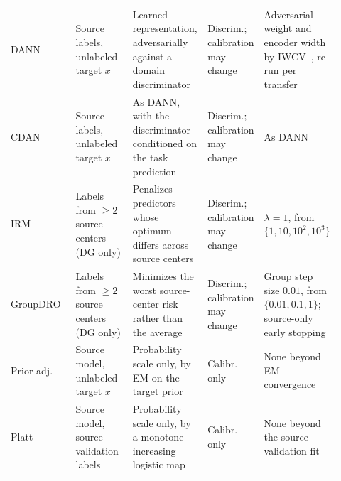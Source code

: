 \begin{table}[t]
\begin{tabular}{@{}p{0.12\linewidth}p{0.20\linewidth}p{0.23\linewidth}p{0.16\linewidth}p{0.21\linewidth}@{}}
DANN~\cite{ganin2016domain} & Source labels, unlabeled target $x$ &
Learned representation, adversarially against a domain discriminator &
Discrim.; calibration may change &
Adversarial weight and encoder width by IWCV~\cite{sugiyama2007covariate},
re-run per transfer \\

CDAN~\cite{long2018conditional} & Source labels, unlabeled target $x$ &
As DANN, with the discriminator conditioned on the task prediction &
Discrim.; calibration may change &
As DANN \\

IRM~\cite{arjovsky2019invariant} &
Labels from $\geq 2$ source centers (DG only) &
Penalizes predictors whose optimum differs across source centers &
Discrim.; calibration may change &
$\lambda = 1$, from $\{1, 10, 10^2, 10^3\}$ \\

GroupDRO~\cite{sagawa2020distributionally} &
Labels from $\geq 2$ source centers (DG only) &
Minimizes the worst source-center risk rather than the average &
Discrim.; calibration may change &
Group step size $0.01$, from $\{0.01, 0.1, 1\}$; source-only early stopping \\

Prior adj.~\cite{saerens2002adjusting} & Source model, unlabeled target $x$ &
Probability scale only, by EM on the target prior &
Calibr. only &
None beyond EM convergence \\

Platt~\cite{platt1999probabilistic} & Source model, source validation labels &
Probability scale only, by a monotone increasing logistic map &
Calibr. only &
None beyond the source-validation fit \\

\bottomrule
\end{tabular}
\end{table}

